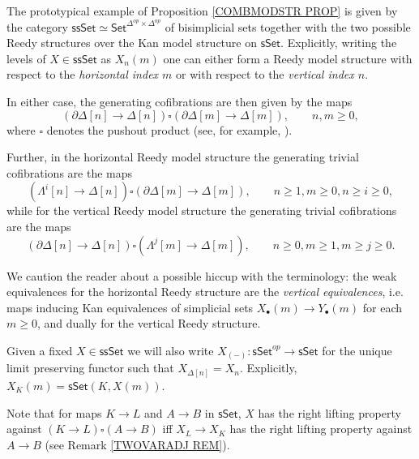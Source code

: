 \documentclass[a4paper,10pt
 ,draft
]{article}%
\begin{document}
The prototypical example of Proposition \ref{COMBMODSTR PROP} is given by the category 
$\mathsf{ssSet} \simeq \mathsf{Set}^{\Delta^{op} \times \Delta^{op}}$
of bisimplicial sets together with the two possible Reedy structures over the Kan model structure on $\mathsf{sSet}$.
Explicitly, writing the levels of 
$X \in \mathsf{ssSet}$ as $X_n(m)$
one can either form a Reedy model structure with respect to the 
\textit{horizontal index $m$}
or with respect to the 
\textit{vertical index $n$}.

In either case, the generating cofibrations are then given by the maps
\[
	\left( \partial \Delta[n] \to \Delta[n] \right)
\square
	\left( \partial \Delta[m] \to \Delta[m] \right),
	\qquad n,m\geq 0,
\]
where $\square$ denotes the pushout product (see, for example, \cite[11.1.7]{Ri14}).

Further, in the horizontal Reedy model structure the generating trivial cofibrations are the maps
\begin{equation}\label{GTRCOHOR EQ}
	\left( \Lambda^i[n] \to \Delta[n] \right)
\square
	\left( \partial \Delta[m] \to \Delta[m] \right),
\qquad n \geq 1, m\geq 0, n \geq i \geq 0,
\end{equation}
while for the vertical Reedy model structure the generating trivial cofibrations are the maps
\begin{equation}\label{GTRCOVER EQ}
	\left( \partial \Delta[n] \to \Delta[n] \right)
\square
	\left( \Lambda^j[m] \to \Delta[m] \right),
\qquad n\geq 0, m\geq 1,m\geq j \geq 0.
\end{equation}

We caution the reader about a possible hiccup with the terminology: 
the weak equivalences for the horizontal Reedy structure are the 
\textit{vertical equivalences},
i.e. maps inducing Kan equivalences of simplicial sets
$X_{\bullet}(m) \to Y_{\bullet}(m)$
for each $m \geq 0$, and dually for the vertical Reedy structure.

\begin{notation}\label{UNIQUELIM NOT}
	Given a fixed $X \in \mathsf{ssSet}$ we will also write
	$X_{(-)} \colon \mathsf{sSet}^{op} \to \mathsf{sSet}$
	for the unique limit preserving functor such that
	$X_{\Delta[n]} = X_n$.
	Explicitly, $X_K(m) = \mathsf{sSet}(K,X(m))$.
	
        
        Note that for maps $K\to L$ and $A\to B$ in $\mathsf{sSet}$, $X$ has the right lifting property against
        $(K \to L) \square (A\to B)$ iff
        $X_L \to X_K$ has the right lifting property against $A\to B$
        (see Remark \ref{TWOVARADJ REM}).
\end{notation}
\end{document}
